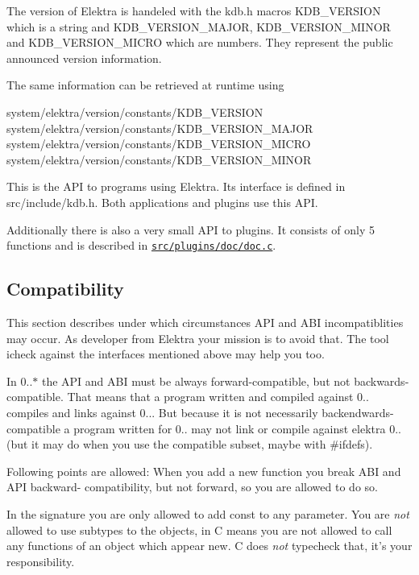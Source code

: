 The version of Elektra is handeled with the kdb.\+h macros {\ttfamily K\+D\+B\+\_\+\+V\+E\+R\+S\+I\+O\+N} which is a string and {\ttfamily K\+D\+B\+\_\+\+V\+E\+R\+S\+I\+O\+N\+\_\+\+M\+A\+J\+O\+R}, {\ttfamily K\+D\+B\+\_\+\+V\+E\+R\+S\+I\+O\+N\+\_\+\+M\+I\+N\+O\+R} and {\ttfamily K\+D\+B\+\_\+\+V\+E\+R\+S\+I\+O\+N\+\_\+\+M\+I\+C\+R\+O} which are numbers. They represent the public announced version information.

The same information can be retrieved at runtime using \begin{DoxyVerb}    system/elektra/version/constants/KDB_VERSION
    system/elektra/version/constants/KDB_VERSION_MAJOR
    system/elektra/version/constants/KDB_VERSION_MICRO
    system/elektra/version/constants/KDB_VERSION_MINOR
\end{DoxyVerb}


This is the A\+P\+I to programs using Elektra. Its interface is defined in src/include/kdb.h. Both applications and plugins use this A\+P\+I.

Additionally there is also a very small A\+P\+I to plugins. It consists of only 5 functions and is described in \href{/home/markus/Projekte/Elektra/current/src/plugins/doc/doc.c}{\tt src/plugins/doc/doc.\+c}.

\subsection*{Compatibility}

This section describes under which circumstances A\+P\+I and A\+B\+I incompatiblities may occur. As developer from Elektra your mission is to avoid that. The tool icheck against the interfaces mentioned above may help you too.

In 0..$\ast$ the A\+P\+I and A\+B\+I must be always forward-\/compatible, but not backwards-\/compatible. That means that a program written and compiled against 0.. compiles and links against 0... But because it is not necessarily backendwards-\/compatible a program written for 0.. may not link or compile against elektra 0.. (but it may do when you use the compatible subset, maybe with \#ifdefs).

Following points are allowed\+: When you add a new function you break A\+B\+I and A\+P\+I backward-\/ compatibility, but not forward, so you are allowed to do so.

In the signature you are only allowed to add const to any parameter. You are {\itshape not} allowed to use subtypes to the objects, in C means you are not allowed to call any functions of an object which appear new. C does {\itshape not} typecheck that, it's your responsibility.

